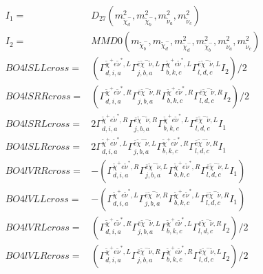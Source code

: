 \documentclass[A4,landscape]{article}
\begin{document}
\begin{align} 
I_1 = & D_{27}(m^2_{\tilde{\chi}^-_{{d}}}, m^2_{\tilde{\chi}^-_{{b}}}, m^2_{\tilde{\nu}_{{a}}}, m^2_{\tilde{\nu}_{{c}}}) \\ 
I_2 = & MMD0(m_{\tilde{\chi}^-_{{b}}}, m_{\tilde{\chi}^-_{{d}}}, m^2_{\tilde{\chi}^-_{{d}}}, m^2_{\tilde{\chi}^-_{{b}}}, m^2_{\tilde{\nu}_{{a}}}, m^2_{\tilde{\nu}_{{c}}}) \\ 
  BO4lSLLcross= & ( \Gamma^{\tilde{\chi}^+e \tilde{\nu}^*,L}_{d, i, a} \Gamma^{\bar{e}\tilde{\chi}^- \tilde{\nu} ,L}_{j, b, a} \Gamma^{\tilde{\chi}^+e \tilde{\nu}^*,L}_{b, k, c} \Gamma^{\bar{e}\tilde{\chi}^- \tilde{\nu} ,L}_{l, d, c} I_2)/2 \\ 
  BO4lSRRcross= & ( \Gamma^{\tilde{\chi}^+e \tilde{\nu}^*,R}_{d, i, a} \Gamma^{\bar{e}\tilde{\chi}^- \tilde{\nu} ,R}_{j, b, a} \Gamma^{\tilde{\chi}^+e \tilde{\nu}^*,R}_{b, k, c} \Gamma^{\bar{e}\tilde{\chi}^- \tilde{\nu} ,R}_{l, d, c} I_2)/2 \\ 
  BO4lSRLcross= & 2  \Gamma^{\tilde{\chi}^+e \tilde{\nu}^*,R}_{d, i, a} \Gamma^{\bar{e}\tilde{\chi}^- \tilde{\nu} ,R}_{j, b, a} \Gamma^{\tilde{\chi}^+e \tilde{\nu}^*,L}_{b, k, c} \Gamma^{\bar{e}\tilde{\chi}^- \tilde{\nu} ,L}_{l, d, c} I_1 \\ 
  BO4lSLRcross= & 2  \Gamma^{\tilde{\chi}^+e \tilde{\nu}^*,L}_{d, i, a} \Gamma^{\bar{e}\tilde{\chi}^- \tilde{\nu} ,L}_{j, b, a} \Gamma^{\tilde{\chi}^+e \tilde{\nu}^*,R}_{b, k, c} \Gamma^{\bar{e}\tilde{\chi}^- \tilde{\nu} ,R}_{l, d, c} I_1 \\ 
  BO4lVRRcross= & -( \Gamma^{\tilde{\chi}^+e \tilde{\nu}^*,R}_{d, i, a} \Gamma^{\bar{e}\tilde{\chi}^- \tilde{\nu} ,L}_{j, b, a} \Gamma^{\tilde{\chi}^+e \tilde{\nu}^*,R}_{b, k, c} \Gamma^{\bar{e}\tilde{\chi}^- \tilde{\nu} ,L}_{l, d, c} I_1) \\ 
  BO4lVLLcross= & -( \Gamma^{\tilde{\chi}^+e \tilde{\nu}^*,L}_{d, i, a} \Gamma^{\bar{e}\tilde{\chi}^- \tilde{\nu} ,R}_{j, b, a} \Gamma^{\tilde{\chi}^+e \tilde{\nu}^*,L}_{b, k, c} \Gamma^{\bar{e}\tilde{\chi}^- \tilde{\nu} ,R}_{l, d, c} I_1) \\ 
  BO4lVRLcross= & ( \Gamma^{\tilde{\chi}^+e \tilde{\nu}^*,R}_{d, i, a} \Gamma^{\bar{e}\tilde{\chi}^- \tilde{\nu} ,L}_{j, b, a} \Gamma^{\tilde{\chi}^+e \tilde{\nu}^*,L}_{b, k, c} \Gamma^{\bar{e}\tilde{\chi}^- \tilde{\nu} ,R}_{l, d, c} I_2)/2 \\ 
  BO4lVLRcross= & ( \Gamma^{\tilde{\chi}^+e \tilde{\nu}^*,L}_{d, i, a} \Gamma^{\bar{e}\tilde{\chi}^- \tilde{\nu} ,R}_{j, b, a} \Gamma^{\tilde{\chi}^+e \tilde{\nu}^*,R}_{b, k, c} \Gamma^{\bar{e}\tilde{\chi}^- \tilde{\nu} ,L}_{l, d, c} I_2)/2 \\ 

\end{align}
\end{document}
